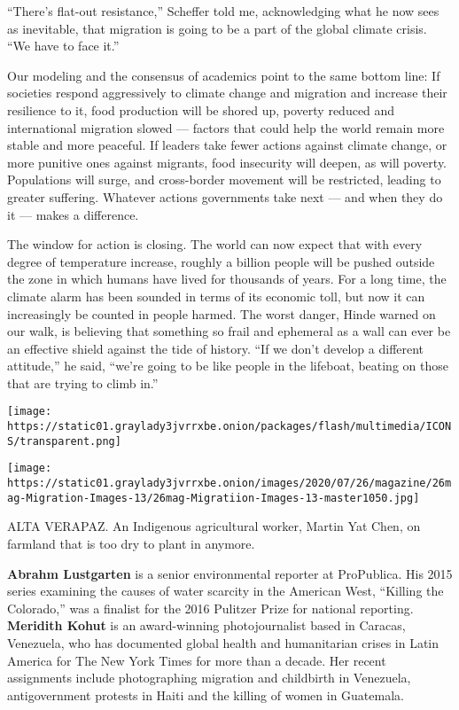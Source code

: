 ``There's flat-out resistance,'' Scheffer told me, acknowledging what he
now sees as inevitable, that migration is going to be a part of the
global climate crisis. ``We have to face it.''

Our modeling and the consensus of academics point to the same bottom
line: If societies respond aggressively to climate change and migration
and increase their resilience to it, food production will be shored up,
poverty reduced and international migration slowed --- factors that
could help the world remain more stable and more peaceful. If leaders
take fewer actions against climate change, or more punitive ones against
migrants, food insecurity will deepen, as will poverty. Populations will
surge, and cross-border movement will be restricted, leading to greater
suffering. Whatever actions governments take next --- and when they do
it --- makes a difference.

The window for action is closing. The world can now expect that with
every degree of temperature increase, roughly a billion people will be
pushed outside the zone in which humans have lived for thousands of
years. For a long time, the climate alarm has been sounded in terms of
its economic toll, but now it can increasingly be counted in people
harmed. The worst danger, Hinde warned on our walk, is believing that
something so frail and ephemeral as a wall can ever be an effective
shield against the tide of history. ``If we don't develop a different
attitude,'' he said, ``we're going to be like people in the lifeboat,
beating on those that are trying to climb in.''

\texttt{[image: https://static01.graylady3jvrrxbe.onion/packages/flash/multimedia/ICONS/transparent.png]}

\texttt{[image: https://static01.graylady3jvrrxbe.onion/images/2020/07/26/magazine/26mag-Migration-Images-13/26mag-Migratiion-Images-13-master1050.jpg]}

ALTA VERAPAZ. An Indigenous agricultural worker, Martin Yat Chen, on
farmland that is too dry to plant in anymore.

\textbf{Abrahm Lustgarten} is a senior environmental reporter at
ProPublica. His 2015 series examining the causes of water scarcity in
the American West, ``Killing the Colorado,'' was a finalist for the 2016
Pulitzer Prize for national reporting. \textbf{Meridith Kohut} is an
award-winning photojournalist based in Caracas, Venezuela, who has
documented global health and humanitarian crises in Latin America for
The New York Times for more than a decade. Her recent assignments
include photographing migration and childbirth in Venezuela,
antigovernment protests in Haiti and the killing of women in Guatemala.

